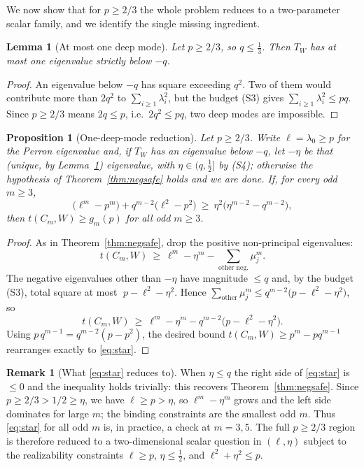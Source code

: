 \documentclass[11pt]{article}
\newtheorem{proposition}[theorem]{Proposition}
\newtheorem{lemma}[theorem]{Lemma}
\theoremstyle{definition}
\newtheorem{remark}[theorem]{Remark}
\newcommand{\1}{\mathbf{1}}
\begin{document}
We now show that for $p\ge 2/3$ the whole problem reduces to a two-parameter
scalar family, and we identify the single missing ingredient.

\begin{lemma}[At most one deep mode]\label{lem:onedeep}
Let $p\ge 2/3$, so $q\le\tfrac13$. Then $T_W$ has at most one eigenvalue strictly
below $-q$.
\end{lemma}

\begin{proof}
An eigenvalue below $-q$ has square exceeding $q^2$. Two of them would contribute
more than $2q^2$ to $\sum_{i\ge1}\lambda_i^2$, but the budget (S3) gives
$\sum_{i\ge1}\lambda_i^2\le pq$. Since $p\ge2/3$ means $2q\le p$, i.e.\
$2q^2\le pq$, two deep modes are impossible.
\end{proof}

\begin{proposition}[One-deep-mode reduction]\label{prop:onedeep}
Let $p\ge 2/3$. Write $\ell=\lambda_0\ge p$ for the Perron eigenvalue and, if
$T_W$ has an eigenvalue below $-q$, let $-\eta$ be that (unique, by
Lemma~\ref{lem:onedeep}) eigenvalue, with $\eta\in(q,\tfrac12]$ by (S4);
otherwise the hypothesis of Theorem~\ref{thm:negsafe} holds and we are done.
If, for every odd $m\ge3$,
\begin{equation}\label{eq:star}
\bigl(\ell^m-p^m\bigr)+q^{m-2}\bigl(\ell^2-p^2\bigr)
\ \ge\ \eta^2\bigl(\eta^{m-2}-q^{m-2}\bigr),
\tag{$\star$}
\end{equation}
then $t(C_m,W)\ge g_m(p)$ for all odd $m\ge3$.
\end{proposition}

\begin{proof}
As in Theorem~\ref{thm:negsafe}, drop the positive non-principal eigenvalues:
\[
t(C_m,W)\ \ge\ \ell^m-\eta^m-\sum_{\text{other neg.}}\mu_j^m.
\]
The negative eigenvalues other than $-\eta$ have magnitude $\le q$ and, by the
budget (S3), total square at most $\;p-\ell^2-\eta^2$. Hence
$\sum_{\text{other}}\mu_j^m\le q^{m-2}\bigl(p-\ell^2-\eta^2\bigr)$, so
\[
t(C_m,W)\ \ge\ \ell^m-\eta^m-q^{m-2}\bigl(p-\ell^2-\eta^2\bigr).
\]
Using $p\,q^{m-1}=q^{m-2}(p-p^2)$, the desired bound $t(C_m,W)\ge p^m-pq^{m-1}$
rearranges exactly to \eqref{eq:star}.
\end{proof}

\begin{remark}[What \eqref{eq:star} reduces to]\label{rem:starsmallm}
When $\eta\le q$ the right side of \eqref{eq:star} is $\le0$ and the inequality
holds trivially: this recovers Theorem~\ref{thm:negsafe}. Since $p\ge2/3>1/2\ge
\eta$, we have $\ell\ge p>\eta$, so $\ell^m-\eta^m$ grows and the left side
dominates for large $m$; the binding constraints are the smallest odd $m$. Thus
\eqref{eq:star} for all odd $m$ is, in practice, a check at $m=3,5$. The full
$p\ge2/3$ region is therefore reduced to a two-dimensional scalar question in
$(\ell,\eta)$ subject to the realizability constraints $\ell\ge p$,
$\eta\le\tfrac12$, and $\ell^2+\eta^2\le p$.
\end{remark}
\end{document}
